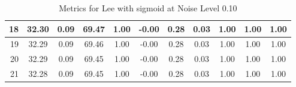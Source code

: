 \begin{table}[htb]
\begin{tabular}{|r|cccccccccc|}
      18 &  32.30 &  0.09 &  69.47 &  1.00 &  -0.00 &  0.28 &  0.03 &  1.00 &  1.00 &  1.00  \\ \hline 
      19 &  32.29 &  0.09 &  69.46 &  1.00 &  -0.00 &  0.28 &  0.03 &  1.00 &  1.00 &  1.00  \\ \hline 
      20 &  32.29 &  0.09 &  69.45 &  1.00 &  -0.00 &  0.28 &  0.03 &  1.00 &  1.00 &  1.00  \\ \hline 
      21 &  32.28 &  0.09 &  69.45 &  1.00 &  -0.00 &  0.28 &  0.03 &  1.00 &  1.00 &  1.00  \\ \hline 
    \end{tabular}
    \caption{Metrics for Lee with sigmoid at Noise Level 0.10}
    \end{table}



